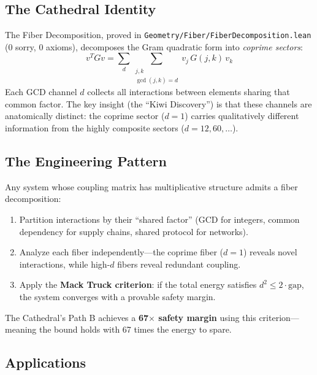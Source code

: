 \documentclass[11pt,a4paper]{article}
\begin{document}
\subsection{The Cathedral Identity}

The Fiber Decomposition, proved in
\texttt{Geometry/Fiber/FiberDecomposition.lean}
(0 sorry, 0 axioms), decomposes the Gram quadratic form into
\emph{coprime sectors}:
\begin{equation}
  v^T G v = \sum_{d} \sum_{\substack{j,k \\ \gcd(j,k) = d}}
  v_j\, G(j,k)\, v_k
\end{equation}
Each GCD channel $d$ collects all interactions between elements
sharing that common factor. The key insight (the ``Kiwi Discovery'')
is that these channels are anatomically distinct: the coprime
sector ($d = 1$) carries qualitatively different information from
the highly composite sectors ($d = 12, 60, \ldots$).

\subsection{The Engineering Pattern}

Any system whose coupling matrix has multiplicative structure
admits a fiber decomposition:
\begin{enumerate}
  \item Partition interactions by their ``shared factor'' (GCD for
    integers, common dependency for supply chains, shared protocol
    for networks).
  \item Analyze each fiber independently---the coprime fiber
    ($d = 1$) reveals novel interactions, while high-$d$ fibers
    reveal redundant coupling.
  \item Apply the \textbf{Mack Truck criterion}: if the total
    energy satisfies $d^2 \leq 2 \cdot \text{gap}$, the system
    converges with a provable safety margin.
\end{enumerate}

The Cathedral's Path B achieves a \textbf{67$\times$ safety margin}
using this criterion---meaning the bound holds with 67 times the
energy to spare.

\subsection{Applications}
\end{document}
